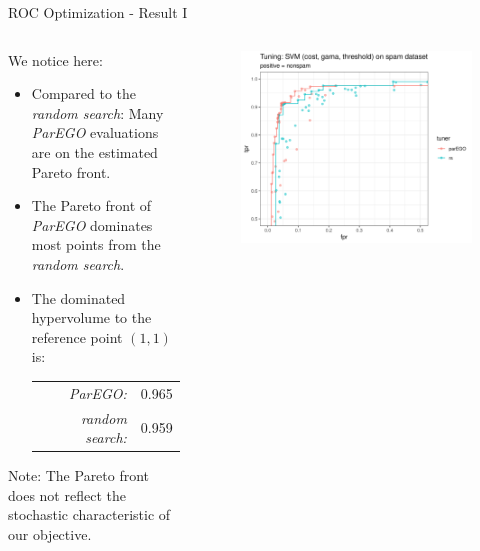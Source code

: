\begin{frame}{ROC Optimization - Result I}

\begin{columns}
\begin{column}{0.45\textwidth}
  We notice here:
  \begin{itemize}
    \item Compared to the \emph{random search}: Many \emph{ParEGO} evaluations are on the estimated Pareto front.
    \item The Pareto front of \emph{ParEGO} dominates most points from the \emph{random search}.
    \item The dominated hypervolume to the reference point $(1,1)$ is:
    \begin{tabular}{rl}
    \emph{ParEGO:} & 0.965\\
    \emph{random search:} & 0.959\\
    \end{tabular}
  \end{itemize}
  Note: The Pareto front does not reflect the stochastic characteristic of our objective.
\end{column}%
\begin{column}{0.5\textwidth}
  \begin{figure}
  \includegraphics[width=\textwidth]{images/example_parego_spam.png}
  \end{figure}
\end{column}
\end{columns}

\end{frame}

